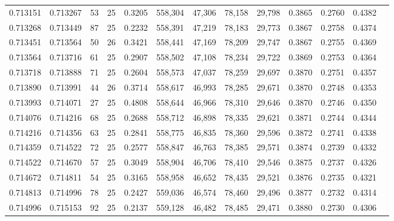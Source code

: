 \begin{tabular}{rrrrrrrrrrrrr}
0.713151 & 0.713267 &    53 &  25 &                                     0.3205 & 558,304 &  47,306 &  78,158 &  29,798 & 0.3865 & 0.2760 & 0.4382 \\
0.713268 & 0.713449 &    87 &  25 &                                     0.2232 & 558,391 &  47,219 &  78,183 &  29,773 & 0.3867 & 0.2758 & 0.4374 \\
0.713451 & 0.713564 &    50 &  26 &                                     0.3421 & 558,441 &  47,169 &  78,209 &  29,747 & 0.3867 & 0.2755 & 0.4369 \\
0.713564 & 0.713716 &    61 &  25 &                                     0.2907 & 558,502 &  47,108 &  78,234 &  29,722 & 0.3869 & 0.2753 & 0.4364 \\
0.713718 & 0.713888 &    71 &  25 &                                     0.2604 & 558,573 &  47,037 &  78,259 &  29,697 & 0.3870 & 0.2751 & 0.4357 \\
0.713890 & 0.713991 &    44 &  26 &                                     0.3714 & 558,617 &  46,993 &  78,285 &  29,671 & 0.3870 & 0.2748 & 0.4353 \\
0.713993 & 0.714071 &    27 &  25 &                                     0.4808 & 558,644 &  46,966 &  78,310 &  29,646 & 0.3870 & 0.2746 & 0.4350 \\
0.714076 & 0.714216 &    68 &  25 &                                     0.2688 & 558,712 &  46,898 &  78,335 &  29,621 & 0.3871 & 0.2744 & 0.4344 \\
0.714216 & 0.714356 &    63 &  25 &                                     0.2841 & 558,775 &  46,835 &  78,360 &  29,596 & 0.3872 & 0.2741 & 0.4338 \\
0.714359 & 0.714522 &    72 &  25 &                                     0.2577 & 558,847 &  46,763 &  78,385 &  29,571 & 0.3874 & 0.2739 & 0.4332 \\
0.714522 & 0.714670 &    57 &  25 &                                     0.3049 & 558,904 &  46,706 &  78,410 &  29,546 & 0.3875 & 0.2737 & 0.4326 \\
0.714672 & 0.714811 &    54 &  25 &                                     0.3165 & 558,958 &  46,652 &  78,435 &  29,521 & 0.3876 & 0.2735 & 0.4321 \\
0.714813 & 0.714996 &    78 &  25 &                                     0.2427 & 559,036 &  46,574 &  78,460 &  29,496 & 0.3877 & 0.2732 & 0.4314 \\
0.714996 & 0.715153 &    92 &  25 &                                     0.2137 & 559,128 &  46,482 &  78,485 &  29,471 & 0.3880 & 0.2730 & 0.4306 \\

\end{tabular}
